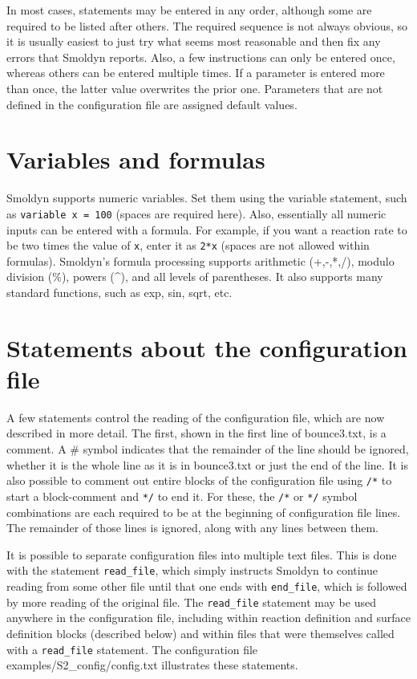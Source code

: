 \documentclass {scrbook}
\newcommand {\ttt} {\texttt}
\begin{document}
In most cases, statements may be entered in any order, although some are required to be listed after others. The required sequence is not always obvious, so it is usually easiest to just try what seems most reasonable and then fix any errors that Smoldyn reports. Also, a few instructions can only be entered once, whereas others can be entered multiple times. If a parameter is entered more than once, the latter value overwrites the prior one. Parameters that are not defined in the configuration file are assigned default values.

\section{Variables and formulas}

Smoldyn supports numeric variables. Set them using the variable statement, such as \ttt{variable x = 100} (spaces are required here). Also, essentially all numeric inputs can be entered with a formula. For example, if you want a reaction rate to be two times the value of \ttt{x}, enter it as \ttt{2*x} (spaces are not allowed within formulas). Smoldyn's formula processing supports arithmetic (+,-,*,/), modulo division (\%), powers (\^{}), and all levels of parentheses. It also supports many standard functions, such as exp, sin, sqrt, etc.

\section{Statements about the configuration file}

A few statements control the reading of the configuration file, which are now described in more detail. The first, shown in the first line of bounce3.txt, is a comment. A \# symbol indicates that the remainder of the line should be ignored, whether it is the whole line as it is in bounce3.txt or just the end of the line. It is also possible to comment out entire blocks of the configuration file using \ttt{/*} to start a block-comment and \ttt{*/} to end it. For these, the \ttt{/*} or \ttt{*/} symbol combinations are each required to be at the beginning of configuration file lines. The remainder of those lines is ignored, along with any lines between them.

It is possible to separate configuration files into multiple text files. This is done with the statement \ttt{read\_file}, which simply instructs Smoldyn to continue reading from some other file until that one ends with \ttt{end\_file}, which is followed by more reading of the original file. The \ttt{read\_file} statement may be used anywhere in the configuration file, including within reaction definition and surface definition blocks (described below) and within files that were themselves called with a \ttt{read\_file} statement. The configuration file examples/S2\_config/config.txt illustrates these statements.
\end{document}
